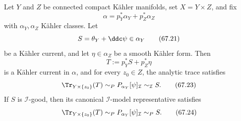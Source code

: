\begin{theorem}\label{thm:functor-split-trace}
Let $Y$ and $Z$ be connected compact K\"ahler manifolds, set
$X=Y\times Z$, and fix
\[
              \alpha=p_Y^*\alpha_Y+p_Z^*\alpha_Z
\tag{67.20}\label{eq:functor-split-class}
\]
with $\alpha_Y,\alpha_Z$ K\"ahler classes. Let
\[
             S=\theta_Y+\ddc\psi\in\alpha_Y
\tag{67.21}\label{eq:functor-prescribed-current}
\]
be a K\"ahler current, and let
$\eta\in\alpha_Z$ be a smooth K\"ahler form. Then
\[
                    T:=p_Y^*S+p_Z^*\eta
\tag{67.22}\label{eq:functor-product-current}
\]
is a K\"ahler current in $\alpha$, and for every $z_0\in Z$,
the analytic trace satisfies
\[
 \Tr_{Y\times\{z_0\}}(T)
       \sim_P P_{\alpha_Y}[\psi]_{\mathcal I}
       \sim_{\mathcal I}S.
\tag{67.23}\label{eq:functor-product-trace}
\]
If $S$ is $\mathcal I$-good, then its canonical
$\mathcal I$-model representative satisfies
\[
 \Tr_{Y\times\{z_0\}}(T)
 \sim_P P_{\alpha_Y}[\psi]_{\mathcal I}
 \sim_P S.
\tag{67.24}\label{eq:functor-product-p-good}
\]
\end{theorem}

